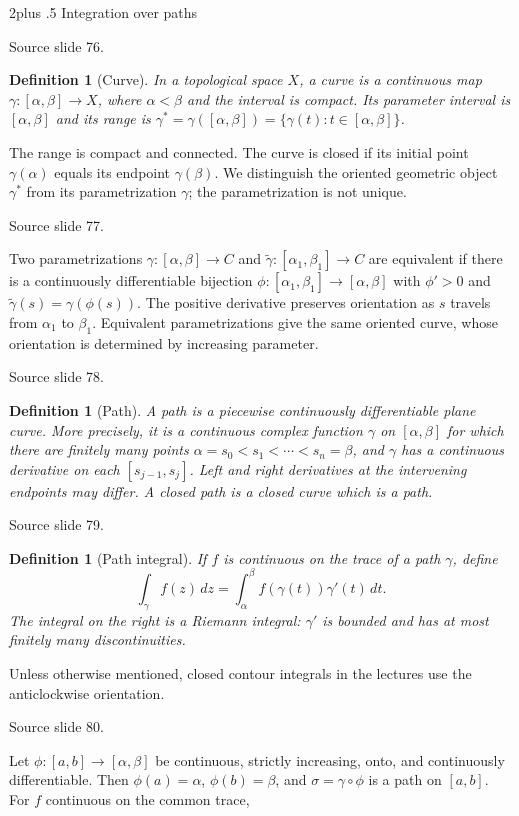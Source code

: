 \documentclass[10pt,letterpaper,twoside,openright]{amsbook}
\makeatletter
\numberwithin{equation}{subsection}
\renewcommand{\section}{\@startsection{section}{1}
 {\z@}{2\baselineskip plus .5\baselineskip}
 {\baselineskip}{\normalfont\Large\bfseries\centering}}
\theoremstyle{sea-plain}
\theoremstyle{sea-definition}
\newtheorem{definition}[subsection]{Definition}
\theoremstyle{sea-exercise}
\newcommand{\RR}{\mathbb{R}}
\newcommand{\CC}{\mathbb{C}}
\newcommand{\DD}{\mathbb{D}}
\newcommand{\HH}{\mathbb{H}}
\newcommand{\Chat}{\mathbb{C}_{\infty}}
\newcommand{\dd}{\,d}
\def\CC{C}\def\RR{R}\def\DD{D}\def\HH{H}\def\Chat{C infinity}}
\newcommand{\src}[1]{\par\smallskip\noindent
 {\scriptsize\sffamily\color{SoftWhite}Source slide #1.}\par\nopagebreak\smallskip}
\makeatother
\begin{document}
\section{Integration over paths}
\src{76}
\begin{definition}[Curve]
In a topological space $X$, a curve is a continuous map
$\gamma:[\alpha,\beta]\to X$, where $\alpha<\beta$ and the interval is
compact. Its parameter interval is $[\alpha,\beta]$ and its range is
$\gamma^*=\gamma([\alpha,\beta])=\{\gamma(t):t\in[\alpha,\beta]\}$.
\end{definition}
The range is compact and connected. The curve is closed if its initial
point $\gamma(\alpha)$ equals its endpoint $\gamma(\beta)$.
We distinguish the oriented geometric object $\gamma^*$ from its
parametrization $\gamma$; the parametrization is not unique.
\src{77}
Two parametrizations $\gamma:[\alpha,\beta]\to\CC$ and
$\widetilde\gamma:[\alpha_1,\beta_1]\to\CC$ are equivalent if there is a
continuously differentiable bijection
$\phi:[\alpha_1,\beta_1]\to[\alpha,\beta]$ with $\phi'>0$ and
$\widetilde\gamma(s)=\gamma(\phi(s))$.
The positive derivative preserves orientation as $s$ travels from
$\alpha_1$ to $\beta_1$. Equivalent parametrizations give the same oriented
curve, whose orientation is determined by increasing parameter.
\src{78}
\begin{definition}[Path]
A path is a piecewise continuously differentiable plane curve. More precisely,
it is a continuous complex function $\gamma$ on $[\alpha,\beta]$ for which
there are finitely many points
$\alpha=s_0<s_1<\cdots<s_n=\beta$, and $\gamma$ has a continuous derivative
on each $[s_{j-1},s_j]$. Left and right derivatives at the intervening
endpoints may differ. A closed path is a closed curve which is a path.
\end{definition}
\src{79}
\begin{definition}[Path integral]
If $f$ is continuous on the trace of a path $\gamma$, define
\[
 \int_\gamma f(z)\dd z=\int_\alpha^\beta f(\gamma(t))\gamma'(t)\dd t.
\]
The integral on the right is a Riemann integral: $\gamma'$ is bounded
and has at most finitely many discontinuities.
\end{definition}
Unless otherwise mentioned, closed contour integrals in the lectures use
the anticlockwise orientation.
\src{80}
Let $\phi:[a,b]\to[\alpha,\beta]$ be continuous, strictly increasing,
onto, and continuously differentiable. Then
$\phi(a)=\alpha$, $\phi(b)=\beta$, and $\sigma=\gamma\circ\phi$ is a
path on $[a,b]$. For $f$ continuous on the common trace,
\end{document}
